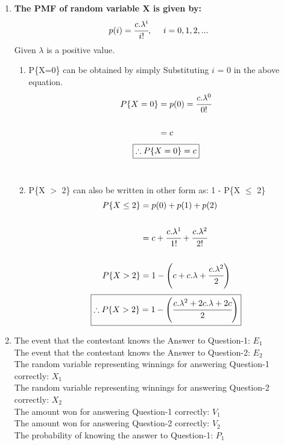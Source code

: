 \documentclass{article}
\begin{document}
\begin{enumerate}
\newpage
\item \textbf{The PMF of random variable X is given by:}
\begin{align*}
  p(i) = \cfrac{c.\lambda^i}{i!},\ \ \ \ i = 0, 1, 2,...\\
\end{align*}
\textnormal{Given $\lambda$ is a positive value.}
  \begin{enumerate}
    \item P\{X=0\} can be obtained by simply Substituting \(i\) = 0 in the above equation.
    \begin{align*}
      P\{X=0\} &= p(0) = \cfrac{c.\lambda^0}{0!}\\\\
      &= c
    \end{align*}
    \[
     \boxed{\therefore P\{X=0\} = c}\\
    \]\\
    \item P\{X \(>\) 2\} can also be written in other form as: 1 - P\{X \(\leq\) 2\}
    \begin{align*}
      P\{X\leq 2\} &= p(0) + p(1) + p(2)\\\\
      &= c + \cfrac{c.\lambda^1}{1!} + \cfrac{c.\lambda^2}{2!}\\\\
      P\{X > 2\} &= 1 - \left(c + c.\lambda + \cfrac{c.\lambda^2}{2}\right)\\
    \end{align*}
    \[
     \boxed{\therefore P\{X > 2\} = 1 - \left(\cfrac{c.\lambda^2 + 2c.\lambda + 2c}{2}\right)}\\
    \]
  \end{enumerate}
\newpage
\item 
  The event that the contestant knows the Answer to Question-1: \(E_1\)\\
  The event that the contestant knows the Answer to Question-2: \(E_2\)\\
  The random variable representing winnings for answering Question-1 correctly: \(X_1\)\\
  The random variable representing winnings for answering Question-2 correctly: \(X_2\)\\
  The amount won for answering Question-1 correctly: \(V_1\)\\
  The amount won for answering Question-2 correctly: \(V_2\)\\
  The probability of knowing the answer to Question-1: \(P_1\)\\

\end{enumerate}
\end{document}
